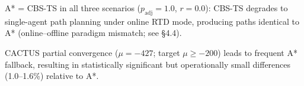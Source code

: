 \begin{table}[htbp]
\begin{threeparttable}
\begin{tablenotes}
      \item A* = CBS-TS in all three scenarios ($p_{\mathrm{adj}}{=}1.0$, $r{=}0.0$):
            CBS-TS degrades to single-agent path planning under online RTD mode,
            producing paths identical to A* (online--offline paradigm mismatch; see \S4.4).
      \item CACTUS partial convergence ($\mu{=}{-}427$; target $\mu{\geq}{-}200$)
            leads to frequent A* fallback, resulting in statistically significant but
            operationally small differences (1.0--1.6\%) relative to A*.
    \end{tablenotes}
  \end{threeparttable}
\end{table}


